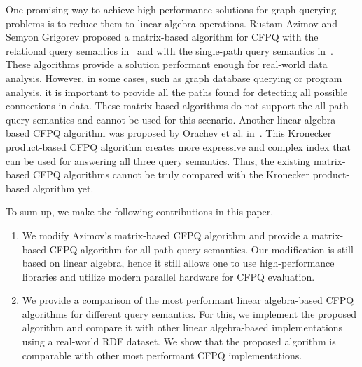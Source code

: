 One promising way to achieve high-performance solutions for graph querying problems is to reduce them to linear algebra operations. Rustam Azimov and Semyon Grigorev proposed a matrix-based algorithm for CFPQ with the relational query semantics in~\cite{Azimov:2018:CPQ:3210259.3210264} and with the single-path query semantics in~\cite{10.1145/3398682.3399163}.
These algorithms provide a solution performant enough for real-world data analysis.
However, in some cases, such as graph database querying or program analysis, it is important to provide all the paths found for detecting all possible connections in data. These matrix-based algorithms do not support the all-path query semantics and cannot be used for this scenario. Another linear algebra-based CFPQ algorithm was proposed by Orachev et al. in~\cite{kron}. This Kronecker product-based CFPQ algorithm creates more expressive and complex index that can be used for answering all three query semantics. Thus, the existing matrix-based CFPQ algorithms cannot be truly compared with the Kronecker product-based algorithm yet.

To sum up, we make the following contributions in this paper.
\begin{enumerate}
	\item We modify Azimov's matrix-based CFPQ algorithm and provide a matrix-based CFPQ algorithm for all-path query semantics.
	Our modification is still based on linear algebra, hence it still allows one to use high-performance libraries and utilize modern parallel hardware for CFPQ evaluation.
	\item We provide a comparison of the most performant linear algebra-based CFPQ algorithms for different query semantics. For this, we implement the proposed algorithm and compare it with other linear algebra-based implementations using a real-world RDF dataset. We show that the proposed algorithm is comparable with other most performant CFPQ implementations.
\end{enumerate}